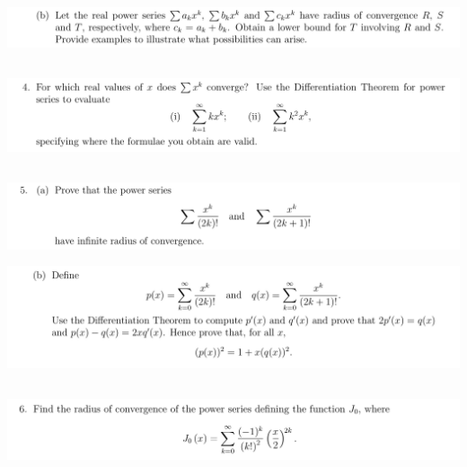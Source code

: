 \documentclass[12pt]{article}
\begin{document}
\begin{mdframed}
\includegraphics[width=400pt]{img/analysis--oxford-M2-I-7-3-b.png}
\end{mdframed}

\newpage
\subsection{}
\begin{mdframed}
\includegraphics[width=400pt]{img/analysis--oxford-M2-I-7-4.png}
\end{mdframed}

\newpage
\subsection{}
\begin{mdframed}
\includegraphics[width=400pt]{img/analysis--oxford-M2-I-7-5.png}
\end{mdframed}

\begin{mdframed}
\includegraphics[width=400pt]{img/analysis--oxford-M2-I-7-5-b.png}
\end{mdframed}

\newpage
\subsection{}
\begin{mdframed}
\includegraphics[width=400pt]{img/analysis--oxford-M2-I-7-6-a.png}
\end{mdframed}
\end{document}
